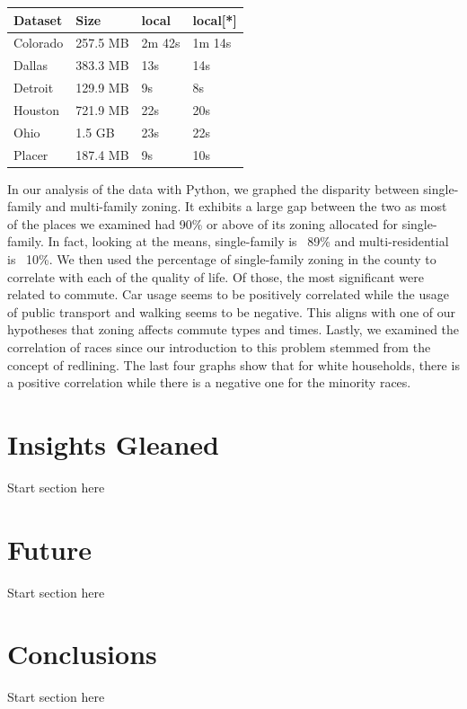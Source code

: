 \documentclass[titlepage]{article}
\begin{document}
\begin{table}[H]
  \centering
  \begin{tabular}{ |p{2cm}|p{2cm}|p{2cm}| p{2cm}| }
  \hline
    Dataset &Size &local &local[*]\\
    \hline
      Colorado & 257.5 MB &2m 42s &1m 14s \\
      Dallas & 383.3 MB &13s &14s \\
      Detroit &129.9 MB &9s &8s \\
      Houston &721.9 MB &22s &20s \\
      Ohio &1.5 GB &23s &22s \\
      Placer &187.4 MB &9s &10s \\
    \hline
  \end{tabular}
  \end{table}

In our analysis of the data with Python, we graphed the disparity between single-family and multi-family zoning. It exhibits a large gap between the two as most of the places we examined had 90\% or above of its zoning allocated for single-family. In fact, looking at the means, single-family is ~89\% and multi-residential is ~10\%. We then used the percentage of single-family zoning in the county to correlate with each of the quality of life. Of those, the most significant were related to commute. Car usage seems to be positively correlated while the usage of public transport and walking seems to be negative. This aligns with one of our hypotheses that zoning affects commute types and times. Lastly, we examined the correlation of races since our introduction to this problem stemmed from the concept of redlining. The last four graphs show that for white households, there is a positive correlation while there is a negative one for the minority races.

\section{Insights Gleaned}
Start section here

\section{Future}
Start section here

\section{Conclusions}
Start section here



\end{document}
